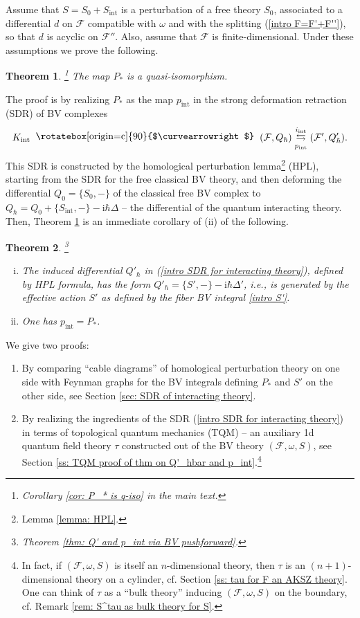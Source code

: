\documentclass{amsart}
\theoremstyle{plain} %
\newtheorem{introthm}{Theorem}
\theoremstyle{definition}
\theoremstyle{remark}
\newcommand{\mr}{\mathrm}
\newcommand{\F}{\mathcal{F}}
\newcommand{\ii}{\mathrm{int}}
\newcommand{\iii}{\mathrm{i}}
\newcommand{\SDR}[5]{#5\;\;\raisebox{1.3pt}{\rotatebox[origin=c]{90}{$\curvearrowright$}}\;\; #1 \underset{#4}{\stackrel{#3}{\leftrightarrows}} #2}  %
\begin{document}
Assume that $S=S_0+S_\mr{int}$ is a perturbation of a free theory $S_0$, associated to a differential $d$ on $\F$ compatible with $\omega$ and with the splitting (\ref{intro F=F'+F''}), so that $d$ is acyclic on $\F''$. Also, assume that $\F$ is finite-dimensional. Under these assumptions we prove the following.
\begin{introthm}\!\!\!\footnote{Corollary \ref{cor: P_* is q-iso} in the main text.}
\label{intro thm A}
    The map $P_*$ is a quasi-isomorphism.
\end{introthm}
The proof is by realizing $P_*$ as the map $p_\ii$ in the strong deformation retraction (SDR) of BV complexes
\begin{equation}\label{intro SDR for interacting theory}
    \SDR{(\F,Q_\hbar)}{(\F',Q'_\hbar)}{i_\ii}{p_\ii}{K_\ii}.
\end{equation}
This SDR is constructed by the homological perturbation lemma\footnote{Lemma \ref{lemma: HPL}.} (HPL), starting from the SDR for the free classical BV theory, and then deforming the differential $Q_0=\{S_0,-\}$ of the classical free BV complex to $Q_\hbar=Q_0+\{S_\ii,-\}-\iii\hbar\Delta$ -- the differential of the quantum interacting theory. 
Then, Theorem \ref{intro thm A} is an immediate corollary of (ii) of the following.
\begin{introthm}\!\!\!\footnote{Theorem \ref{thm: Q' and p_int via BV pushforward}.}
\label{intro thm B}
    \begin{enumerate}[(i)]
        \item The induced differential $Q'_\hbar$ in (\ref{intro SDR for interacting theory}), defined by HPL formula, has the form $Q'_\hbar=\{S',-\}-\iii\hbar \Delta'$, i.e., is generated by the effective action $S'$ as defined by the fiber BV integral \eqref{intro S'}.
        \item One has $p_\ii=P_*$.
    \end{enumerate}
\end{introthm}
We give two proofs: %
\begin{enumerate}[(1)]
    \item By comparing ``cable diagrams'' of homological perturbation theory on one side with Feynman graphs for the BV integrals defining $P_*$ and $S'$ on the other side, see Section \ref{sec: SDR of interacting theory}.
    \item By realizing the ingredients of the SDR (\ref{intro SDR for interacting theory}) in terms of topological quantum mechanics (TQM) -- an auxiliary 1d quantum field theory $\tau$ constructed out of the BV theory $(\F,\omega,S)$, see Section \ref{ss: TQM proof of thm on Q'_hbar and p_int}.\footnote{In fact, if $(\F,\omega,S)$ is itself an $n$-dimensional theory, then $\tau$ is an $(n+1)$-dimensional theory on a cylinder, cf. Section \ref{ss: tau for F an AKSZ theory}.
    One can think of $\tau$ as a ``bulk theory'' inducing $(\F,\omega,S)$ on the boundary, cf. Remark \ref{rem: S^tau as bulk theory for S}.}
\end{enumerate}
\end{document}
